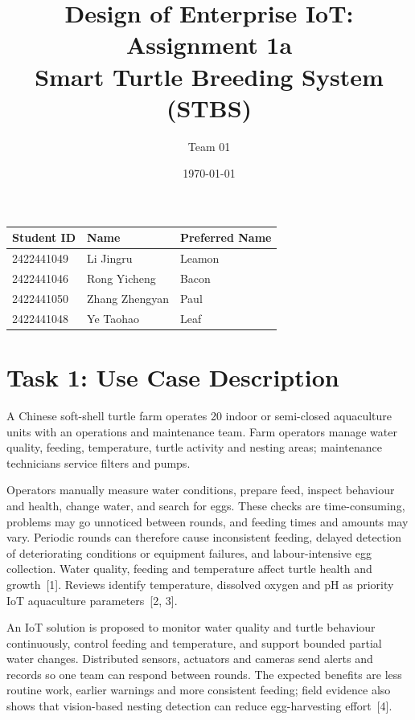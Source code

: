 \documentclass[lang=en,11pt,a4paper]{elegantpaper}
\title{Design of Enterprise IoT: Assignment 1a\\[0.4em]
	\large Smart Turtle Breeding System (STBS)}
\author{\vspace{0.4em}\Large Team 01\vspace{0.4em}}
\institute{Jinling Institute of Technology}
\date{\today}
\begin{document}
\maketitle
\begin{center}
	\renewcommand{\arraystretch}{0.8}
\begin{tabularx}{0.98\textwidth}{@{}llX@{}}
		\toprule
\textbf{Student ID} &
\textbf{Name} &
\textbf{Preferred Name} \\
\midrule
2422441049 & Li Jingru      & Leamon \\
2422441046 & Rong Yicheng   & Bacon  \\
2422441050 & Zhang Zhengyan & Paul   \\
2422441048 & Ye Taohao      & Leaf   \\
		\bottomrule
	\end{tabularx}
\end{center}

\section{Task 1: Use Case Description}

A Chinese soft-shell turtle farm operates 20 indoor or semi-closed aquaculture units with an operations and maintenance team. Farm operators manage water quality, feeding, temperature, turtle activity and nesting areas; maintenance technicians service filters and pumps.

Operators manually measure water conditions, prepare feed, inspect behaviour and health, change water, and search for eggs. These checks are time-consuming, problems may go unnoticed between rounds, and feeding times and amounts may vary. Periodic rounds can therefore cause inconsistent feeding, delayed detection of deteriorating conditions or equipment failures, and labour-intensive egg collection. Water quality, feeding and temperature affect turtle health and growth~[1]. Reviews identify temperature, dissolved oxygen and pH as priority IoT aquaculture parameters~[2, 3].

An IoT solution is proposed to monitor water quality and turtle behaviour continuously, control feeding and temperature, and support bounded partial water changes. Distributed sensors, actuators and cameras send alerts and records so one team can respond between rounds. The expected benefits are less routine work, earlier warnings and more consistent feeding; field evidence also shows that vision-based nesting detection can reduce egg-harvesting effort~[4].
\end{document}
